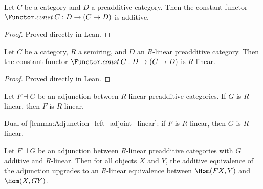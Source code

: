 \begin{lemma}

  \label{lem:Functor_const_additive}
  Let \(C\) be a category and \(D\) a preadditive category. Then the constant functor
  \(\Functor.const\, C : D \to (C \to D)\) is additive.
\end{lemma}

\begin{proof}

\leanok
  Proved directly in Lean.
\end{proof}

\begin{lemma}

  \label{lem:Functor_const_linear}
  Let \(C\) be a category, \(R\) a semiring, and \(D\) an \(R\)-linear preadditive category.
  Then the constant functor \(\Functor.const\, C : D \to (C \to D)\) is \(R\)-linear.
\end{lemma}

\begin{proof}

\leanok
  Proved directly in Lean.
\end{proof}

\begin{lemma}
  \label{lemma:Adjunction_left_adjoint_linear}
  Let \(F \dashv G\) be an adjunction between \(R\)-linear preadditive categories. If \(G\) is \(R\)-linear, then \(F\) is \(R\)-linear.
\end{lemma}

\begin{lemma}
  \label{lemma:Adjunction_right_adjoint_linear}
  Dual of \cref{lemma:Adjunction_left_adjoint_linear}: if \(F\) is \(R\)-linear, then \(G\) is \(R\)-linear.
\end{lemma}

\begin{theorem}
  \label{def:Adjunction_homLinearEquiv}
  
  Let \(F \dashv G\) be an adjunction between \(R\)-linear preadditive categories with \(G\) additive and \(R\)-linear. Then for all objects \(X\) and \(Y\), the additive equivalence of the adjunction upgrades to an \(R\)-linear equivalence between \(\Hom(FX, Y)\) and \(\Hom(X, GY)\).
\end{theorem}

